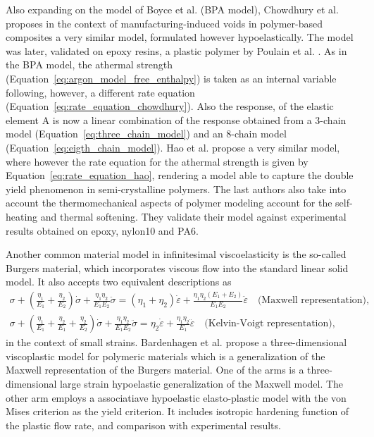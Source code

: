 Also expanding on the model of Boyce et al. \citep{boyceLargeInelasticDeformation1988} (BPA model), Chowdhury et al. \citep{chowdhuryEffectsManufacturingInducedVoids2008} proposes in the context of manufacturing-induced voids in polymer-based composites a very similar model, formulated however hypoelastically.
The model was later, validated on epoxy resins, a plastic polymer by Poulain et al. \citep{poulainFinitestrainElastoviscoplasticBehavior2014}.
As in the BPA model, the athermal strength (Equation~\eqref{eq:argon_model_free_enthalpy}) is taken as an internal variable following, however, a different rate equation (Equation~\eqref{eq:rate_equation_chowdhury}).
Also the response, of the elastic element A is now a linear combination of the response obtained from a 3-chain model (Equation~\eqref{eq:three_chain_model}) and an 8-chain model (Equation~\eqref{eq:eigth_chain_model}).
Hao et al. \citep{haoUnifiedAmorphousCrystalline2022} propose a very similar model, where however the rate equation for the athermal strength is given by Equation~\eqref{eq:rate_equation_hao}, rendering a model able to capture the double yield phenomenon in semi-crystalline polymers.
The last authors also take into account the thermomechanical aspects of polymer modeling account for the self-heating and thermal softening.
They validate their model against experimental results obtained on epoxy, nylon10 and PA6.

Another common material model in infinitesimal viscoelasticity is the so-called Burgers material, which incorporates viscous flow into the standard linear solid model.
It also accepts two equivalent descriptions as
\begin{gather}
	\sigma+\left(\frac{\eta_1}{E_1}+\frac{\eta_2}{E_2}\right) \dot{\sigma}+\frac{\eta_1 \eta_2}{E_1 E_2} \ddot{\sigma}=\left(\eta_1+\eta_2\right) \dot{\varepsilon}+\frac{\eta_1 \eta_2\left(E_1+E_2\right)}{E_1 E_2} \ddot{\varepsilon}\quad \text{(Maxwell representation)},\\
	\sigma+\left(\frac{\eta_1}{E_1}+\frac{\eta_2}{E_1}+\frac{\eta_2}{E_2}\right) \dot{\sigma}+\frac{\eta_1 \eta_2}{E_1 E_2} \ddot{\sigma}=\eta_2 \dot{\varepsilon}+\frac{\eta_1 \eta_2}{E_1} \ddot{\varepsilon}\quad \text{(Kelvin-Voigt representation)},
\end{gather}
in the context of small strains.
Bardenhagen et al. \citep{bardenhagenThreedimensionalFiniteDeformation1997} propose a three-dimensional viscoplastic model for polymeric materials which is a generalization of the Maxwell representation of the Burgers material.
One of the arms is a three-dimensional large strain hypoelastic generalization of the Maxwell model.
The other arm employs a associatiave hypoelastic elasto-plastic model with the von Mises criterion as the yield criterion.
It includes isotropic hardening function of the plastic flow rate, and comparison with experimental results.

